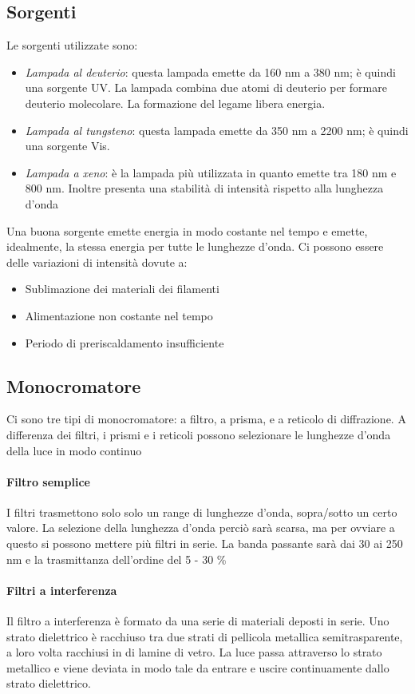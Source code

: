 \subsection{Sorgenti}
Le sorgenti utilizzate sono:
\begin{itemize}
\item \textit{Lampada al deuterio}: questa lampada emette da 160 nm a 380 nm; è quindi una sorgente UV. La lampada combina due atomi di deuterio per formare deuterio molecolare.
La formazione del legame libera energia.
\item \textit{Lampada al tungsteno}: questa lampada emette da 350 nm a 2200 nm; è quindi una sorgente Vis.
\item \textit{Lampada a xeno}: è la lampada più utilizzata in quanto emette tra 180 nm e  800 nm. Inoltre presenta una stabilità di intensità rispetto alla lunghezza d'onda
\end{itemize}

Una buona sorgente emette energia in modo costante nel tempo e emette, idealmente, la stessa energia per tutte le lunghezze d'onda.
Ci possono essere delle variazioni di intensità dovute a:
\begin{itemize}
\item Sublimazione dei materiali dei filamenti
\item Alimentazione non costante nel tempo
\item Periodo di preriscaldamento insufficiente
\end{itemize}

\subsection{Monocromatore}
Ci sono tre tipi di monocromatore: a filtro, a prisma, e a reticolo di diffrazione.
A differenza dei filtri, i prismi e i reticoli possono selezionare le lunghezze d'onda della luce in modo continuo

\paragraph{Filtro semplice}
I filtri trasmettono solo solo un range di lunghezze d'onda, sopra/sotto un certo valore.
La selezione della lunghezza d'onda perciò sarà scarsa, ma per ovviare a questo si possono mettere più filtri in serie.
La banda passante sarà dai 30 ai 250 nm e la trasmittanza dell'ordine del 5 - 30 \%

\paragraph{Filtri a interferenza}
Il filtro a interferenza è formato da una serie di materiali deposti in serie.
Uno strato dielettrico è racchiuso tra due strati di pellicola metallica semitrasparente, a loro volta racchiusi in di lamine di vetro.
La luce passa attraverso lo strato metallico e viene deviata in modo tale da entrare e uscire continuamente dallo strato dielettrico.

